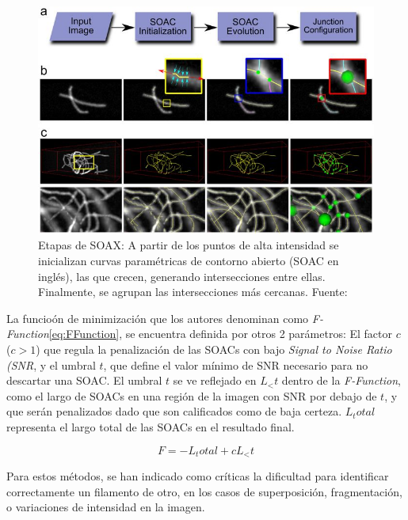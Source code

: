 \begin{figure}[h]
        \centering
        \includegraphics[scale=0.75]{imagenes/SOAX.jpg}
        \caption{Etapas de SOAX: A partir de los puntos de alta intensidad se inicializan curvas param\'etricas de contorno abierto (SOAC en ingl\'es), las que crecen, generando intersecciones entre ellas. Finalmente, se agrupan las intersecciones más cercanas. Fuente: \cite{xu2015soax}}
        \label{fig:SOAX}
\end{figure}

La funcio\'on de minimizaci\'on que los autores denominan como  \textit{F-Function}\eqref{eq:FFunction}, se encuentra definida por otros 2 par\'ametros: El factor $c$ ($c > 1$) que regula la penalizaci\'on de las SOACs con bajo \textit{Signal to Noise Ratio (SNR}, y el umbral $t$, que define el valor mínimo de SNR necesario para no descartar una SOAC. El umbral $t$ se ve reflejado en $L_<t$ dentro de la \textit{F-Function}, como el largo de SOACs en una regi\'on de la imagen con SNR por debajo de $t$, y que ser\'an penalizados dado que son calificados como de baja certeza. $L_total$ representa el largo total de las SOACs en el resultado final.

\begin{equation}
   \label{eq:FFunction}
    F = -L_total + {c}{L_<t} 
\end{equation}



Para estos m\'etodos, se han indicado como cr\'iticas la dificultad para identificar correctamente un filamento de otro, en los casos de  superposici\'on, fragmentaci\'on, o variaciones de intensidad en la imagen.


